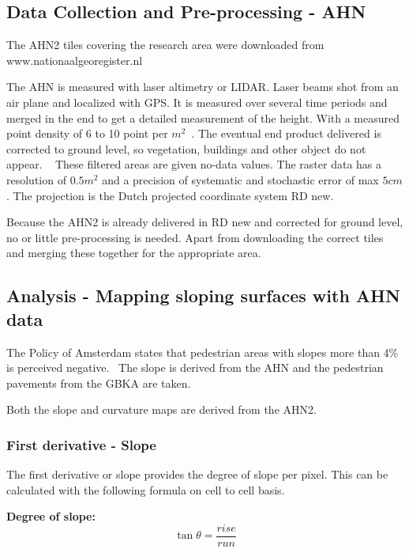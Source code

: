 \subsection{Data Collection and Pre-processing - AHN }
The AHN2 tiles covering the research area were downloaded from www.nationaalgeoregister.nl

The AHN is measured with laser altimetry or LIDAR. Laser beams shot from an air plane and localized with GPS. It is measured over several time periods and merged in the end to get a detailed measurement of the height. With a measured point density of 6 to 10 point per $m^2$~\cite{VanDerZon2013}. The eventual end product delivered is corrected to ground level, so vegetation, buildings and other object do not appear. ~\cite{VanDerZon2013} These filtered areas are given no-data values. The raster data has a resolution of $0.5m^2$ and a precision of systematic and stochastic error of max $5cm$. The projection is the Dutch projected coordinate system RD new. ~\cite{VanDerZon2013}  

Because the AHN2 is already delivered in RD new and corrected for ground level, no or little pre-processing is needed. Apart from downloading the correct tiles and merging these together for the appropriate area. 



\subsection{Analysis - Mapping sloping surfaces with AHN data}

The Policy of Amsterdam states that pedestrian areas with slopes more than 4\% is perceived negative.~\cite{leidraad2011}
The slope is derived from the AHN and the pedestrian pavements from the GBKA are taken.

Both the slope and curvature maps are derived from the AHN2. 

\subsubsection{First derivative - Slope}
The first derivative or slope provides the degree of slope per pixel. This can be calculated with the following formula on cell to cell basis. 

\textbf{Degree of slope:}
\begin{equation}
\tan \theta = \frac{rise}{run}
\end{equation}
~\cite{ahnformula}

